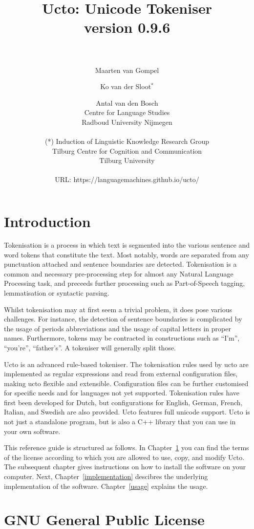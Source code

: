 \documentclass[a4paper,12pt]{report}
\author{Maarten van Gompel \and Ko van der Sloot$^*$ \and Antal van den Bosch \\
        Centre for Language Studies \\
        Radboud University Nijmegen \\ \\  
        (*) Induction of Linguistic Knowledge Research Group\\
		Tilburg Centre for Cognition and Communication\\ 
        Tilburg University \\ \\                    
        URL: https://languagemachines.github.io/ucto/}
\title{{\huge Ucto: Unicode Tokeniser} \\ \vspace*{0.5cm}
{\bf version 0.9.6} \\ \vspace*{0.5cm}{\huge Reference Guide}\\
\vspace*{1cm}} %
\begin{document}

\maketitle

\tableofcontents

\chapter*{Introduction}

Tokenisation is a process in which text is segmented into the various sentence and word tokens that constitute the text. Most notably, words are separated from any punctuation attached and sentence boundaries are detected. Tokenisation is a common and necessary pre-processing step for almost any Natural Language Processing task, and preceeds further processing such as Part-of-Speech tagging, lemmatisation or syntactic parsing. 

Whilst tokenisation may at first seem a trivial problem, it does pose various challenges. For instance, the detection of sentence boundaries is complicated by the usage of periods abbreviations and the usage of capital letters in proper names. Furthermore, tokens may be contracted in constructions such as ``I'm'', ``you're'', ``father's''. A tokeniser will generally split those.

Ucto is an advanced rule-based tokeniser. The tokenisation rules used by ucto are implemented as regular expressions and read from external configuration files, making ucto flexible and extensible. Configuration files can be further customised for specific needs and for languages not yet supported. Tokenisation rules have first been developed for Dutch, but configurations for English, German, French, Italian, and Swedish are also provided. Ucto features full unicode support. Ucto is not just a standalone program, but is also a C++ library that you can use in your own software. 

This reference guide is structured as follows. In Chapter~\ref{license} you can find the terms of the license according to which you are allowed to use, copy, and modify Ucto. The subsequent chapter gives instructions on how to install the software on your computer.  Next, Chapter~\ref{implementation} descibres the underlying implementation of the software. Chapter~\ref{usage} explains the usage.  

\chapter{GNU General Public License}
\label{license}
\end{document}
